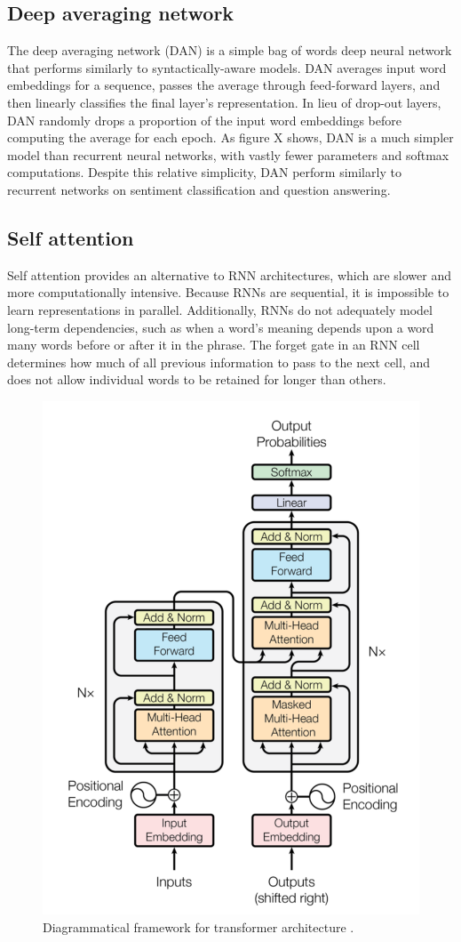 \subsection{Deep averaging network}

The deep averaging network (DAN) \cite{dan} is a simple bag of words deep neural network that performs similarly to syntactically-aware models. DAN averages input word embeddings for a sequence, passes the average through feed-forward layers, and then linearly classifies the final layer's representation. In lieu of drop-out layers, DAN randomly drops a proportion of the input word embeddings before computing the average for each epoch. As figure X shows, DAN is a much simpler model than recurrent neural networks, with vastly fewer parameters and softmax computations. Despite this relative simplicity, DAN perform similarly to recurrent networks on sentiment classification and question answering. 

\subsection{Self attention}

Self attention \cite{attention} provides an alternative to RNN architectures, which are slower and more computationally intensive. Because RNNs are sequential, it is impossible to learn representations in parallel. Additionally, RNNs do not adequately model long-term dependencies, such as when a word's meaning depends upon a word many words before or after it in the phrase. The forget gate in an RNN cell determines how much of all previous information to pass to the next cell, and does not allow individual words to be retained for longer than others. 

\begin{figure}[h!]
\centering
  \includegraphics[width=.5\linewidth]{files/attention-1.png}
  \caption{Diagrammatical framework for transformer architecture \cite{attention}.}
  \label{fig:attention-1}
\end{figure}

